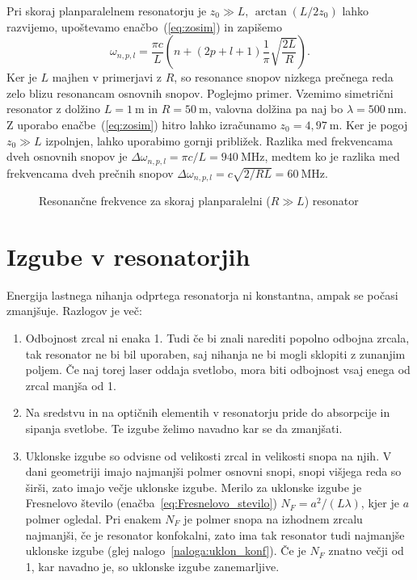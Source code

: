 Pri skoraj planparalelnem 
resonatorju je $z_{0}\gg L$, $\arctan(L/2z_{0})$ lahko razvijemo, 
upoštevamo enačbo~(\ref{eq:zosim}) in zapišemo
\begin{equation}
\omega_{n,p,l}=\frac{\pi c}{L}\left(n+(2p+l+1)\frac{1}{\pi}\sqrt{\frac{2L}{R}}\right).
\end{equation}
Ker je $L$ majhen v primerjavi z $R$, so resonance snopov nizkega prečnega reda 
zelo blizu resonancam osnovnih snopov. Poglejmo primer. Vzemimo 
simetrični resonator z dolžino $L=1~\si{\metre}$ in $R=50~\si{\metre}$, 
valovna dolžina pa naj bo $\lambda= 500~\si{\nano\metre}$. Z uporabo enačbe~(\ref{eq:zosim})
hitro lahko izračunamo $z_0 = 4,97~\si{\metre}$. Ker je pogoj $z_0\gg L$ izpolnjen, lahko uporabimo
gornji približek. Razlika med frekvencama dveh osnovnih snopov je $\Delta \omega_{n,p,l} = 
\pi c/L = 940~\si{\mega\hertz}$, medtem ko je razlika med frekvencama dveh prečnih snopov
$\Delta \omega_{n,p,l} = c\sqrt{2/RL} = 60~\si{\mega\hertz}$.
\begin{figure}[h]
\centering
\def\svgwidth{90truemm} 

\caption{Resonančne frekvence za skoraj planparalelni ($R\gg L$) resonator}
\label{fig:crte}
\end{figure}

\section{Izgube v resonatorjih}
Energija lastnega nihanja odprtega resonatorja ni konstantna, ampak se počasi
zmanjšuje. Razlogov je več:
\begin{enumerate}
\item Odbojnost zrcal ni enaka 1. Tudi če bi znali narediti popolno odbojna zrcala, 
tak resonator ne bi bil uporaben, saj nihanja ne bi mogli sklopiti z zunanjim poljem. Če 
naj torej laser oddaja svetlobo, mora biti odbojnost vsaj enega od zrcal manjša od 1.\\
\item Na sredstvu in na optičnih elementih v resonatorju pride do absorpcije in
sipanja svetlobe. Te izgube želimo navadno kar se da zmanjšati.\\
\item Uklonske izgube so odvisne od velikosti zrcal in velikosti snopa na njih.
V dani geometriji imajo najmanjši polmer osnovni snopi, snopi višjega
reda so širši, zato imajo večje uklonske izgube. Merilo za uklonske
izgube je Fresnelovo število (enačba~\ref{eq:Fresnelovo_stevilo}) 
$N_{F}=a^{2}/(L\lambda)$, kjer je $a$ polmer ogledal. Pri enakem $N_{F}$ je
polmer snopa na izhodnem zrcalu najmanjši, če je resonator konfokalni, 
zato ima tak resonator tudi najmanjše uklonske izgube (glej nalogo~\ref{naloga:uklon_konf}).
Če je $N_{F}$ znatno večji od 1, kar navadno je, so uklonske izgube zanemarljive. 
\end{enumerate}

